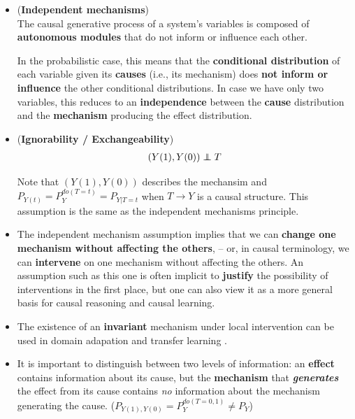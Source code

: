 \documentclass[11pt]{article}
\begin{document}
\begin{itemize}
\item \begin{principle}(\textbf{Independent mechanisms}) \citep{peters2017elements} \\
The causal generative process of a system’s variables is composed of \textbf{autonomous modules} that do not inform or influence each other.

In the probabilistic case, this means that the \textbf{conditional distribution} of each variable given its \textbf{causes} (i.e., its mechanism) does \textbf{not inform or influence} the other conditional distributions. In case we have only two variables, this reduces to an \textbf{independence} between the \textbf{cause} distribution and the \textbf{mechanism} producing the effect distribution.
\end{principle}

\item%
\begin{assumption} (\textbf{Ignorability / Exchangeability}) \citep{neal2020introduction}
\begin{align}
(Y(1), Y(0)) \indep T  \label{eqn: Ignorability}
\end{align}
\end{assumption} Note that $(Y(1), Y(0))$ describes the mechansim and $P_{Y(t)} = P_{Y}^{do(T=t)} = P_{Y|T=t}$ when $T\rightarrow Y$ is a causal structure. This assumption is the same as the independent mechanisms principle.

\item The independent mechanism assumption implies that we can \textbf{change one mechanism without affecting the others}, -- or, in causal terminology, we
can \textbf{intervene} on one mechanism without affecting the others. An assumption such as this one is often implicit to \textbf{justify} the possibility of interventions in
the first place, but one can also view it as a more general basis for causal reasoning and causal learning.

\item The existence of an \textbf{invariant} mechanism under local intervention can be used in domain adapation and transfer learning \citep{peters2017elements}.

\item It is important to distinguish between two levels of information: an \textbf{effect} contains information about its cause, but the \textbf{mechanism} that \textbf{\emph{generates}} the effect from its cause contains \emph{no} information about the mechanism generating the cause. ($P_{Y(1), Y(0)} = P_{Y}^{do(T=0,1)}  \neq P_{Y}$)
\end{itemize}
\end{document}
